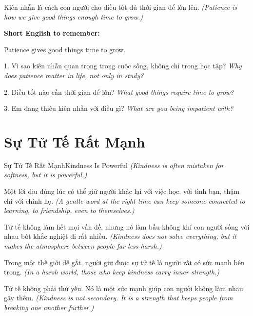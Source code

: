 \begin{baihoc}
Kiên nhẫn là cách con người cho điều tốt đủ thời gian để lớn lên.
\textit{(Patience is how we give good things enough time to grow.)}
\end{baihoc}

\begin{ghinhoanh}
\textbf{Short English to remember:}

Patience gives good things time to grow.

\end{ghinhoanh}

\begin{tuhocnhanh}
1. Vì sao kiên nhẫn quan trọng trong cuộc sống, không chỉ trong học tập? \textit{Why does patience matter in life, not only in study?}

2. Điều tốt nào cần thời gian để lớn? \textit{What good things require time to grow?}

3. Em đang thiếu kiên nhẫn với điều gì? \textit{What are you being impatient with?}
\end{tuhocnhanh}
\ngancach

\section{Sự Tử Tế Rất Mạnh}
\begin{truyen}{Sự Tử Tế Rất Mạnh}{Kindness Is Powerful}
\textit{(Kindness is often mistaken for softness, but it is powerful.)}

Một lời dịu đúng lúc có thể giữ người khác lại với việc học, với tình bạn, thậm chí với chính họ.
\textit{(A gentle word at the right time can keep someone connected to learning, to friendship, even to themselves.)}

Tử tế không làm hết mọi vấn đề, nhưng nó làm bầu không khí con người sống với nhau bớt khắc nghiệt đi rất nhiều.
\textit{(Kindness does not solve everything, but it makes the atmosphere between people far less harsh.)}

Trong một thế giới dễ gắt, người giữ được sự tử tế là người rất có sức mạnh bên trong.
\textit{(In a harsh world, those who keep kindness carry inner strength.)}
\end{truyen}

\begin{baihoc}
Tử tế không phải thứ yếu. Nó là một sức mạnh giúp con người không làm nhau gãy thêm.
\textit{(Kindness is not secondary. It is a strength that keeps people from breaking one another further.)}
\end{baihoc}

